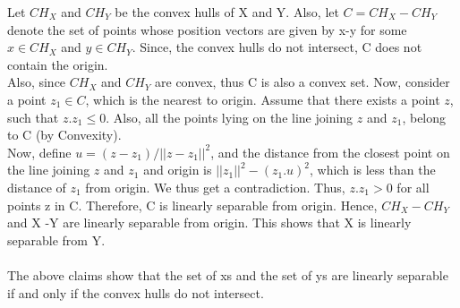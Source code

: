\documentclass{article}
\begin{document}
Let $CH_X$ and $CH_Y$ be the convex hulls of X and Y. Also, let $C = CH_X-CH_Y$ denote the set of points whose position vectors are given by x-y for some $x \in CH_X$ and $y \in CH_Y$. Since, the convex hulls do not intersect, C does not contain the origin.\\

Also, since $CH_X$ and $CH_Y$ are convex, thus C is also a convex set. Now, consider a point $z_1 \in C$, which is the nearest to origin. Assume that there exists a point $z$, such that $z.z_1 \leq 0$. Also, all the points lying on the line joining $z$ and $z_1$, belong to C (by Convexity). \\

Now, define $u= (z-z_1)/||z-z_1||^2 $, and the distance from the closest point on the line joining $z$ and $z_1$ and origin is $||z_1||^2 - (z_1.u)^2$, which is less than the distance of $z_1$ from origin. We thus get a contradiction. Thus, $z.z_1 > 0$ for all points z in C. Therefore, C is linearly separable from origin. Hence, $CH_X-CH_Y$ and X -Y are linearly separable from origin. This shows that X is linearly separable from Y. \\ \\
The above claims show that the set of xs and the set of ys are linearly separable if and only if the convex hulls do not intersect.
\end{document}
